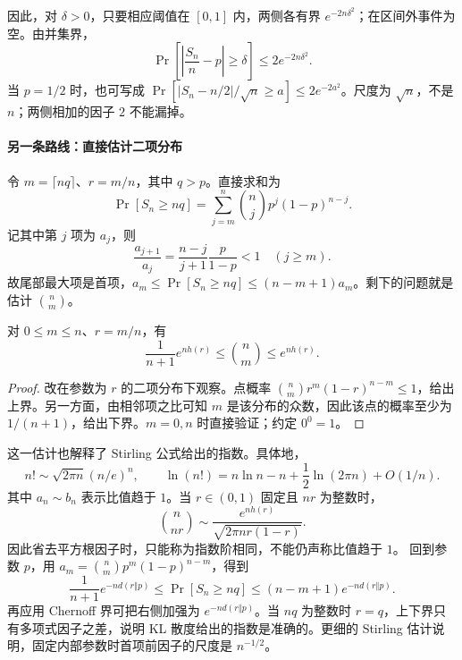 \documentclass[lang=cn,a4paper,fontset=none,zihao=false,10pt,openany,twoside]{beautybook}
\numberwithin{algorithm}{chapter}
\newcommand{\KLsep}{\mathrel{\Vert}}
\begin{document}
因此，对 $\delta>0$，只要相应阈值在 $[0,1]$ 内，两侧各有界 $e^{-2n\delta^2}$；在区间外事件为空。由并集界，
\[
 \Pr\left[\left|\frac{S_n}{n}-p\right|\ge\delta\right]\le2e^{-2n\delta^2}.
\]
当 $p=1/2$ 时，也可写成
$\Pr[|S_n-n/2|/\sqrt n\ge a]\le2e^{-2a^2}$。尺度为 $\sqrt n$，不是 $n$；两侧相加的因子 $2$ 不能漏掉。

\paragraph{另一条路线：直接估计二项分布}
令 $m=\lceil nq\rceil$、$r=m/n$，其中 $q>p$。直接求和为
\[
 \Pr[S_n\ge nq]=\sum_{j=m}^n\binom njp^j(1-p)^{n-j}.
\]
记其中第 $j$ 项为 $a_j$，则
\[
 \frac{a_{j+1}}{a_j}=\frac{n-j}{j+1}\frac p{1-p}<1\quad(j\ge m).
\]
故尾部最大项是首项，$a_m\le\Pr[S_n\ge nq]\le(n-m+1)a_m$。剩下的问题就是估计 $\binom nm$。
\begin{proposition}[二项系数的熵界]\label{prop:binomial-entropy}
对 $0\le m\le n$、$r=m/n$，有
\[
 \frac1{n+1}e^{nh(r)}\le\binom nm\le e^{nh(r)}.
\]
\end{proposition}
\begin{proof}
改在参数为 $r$ 的二项分布下观察。点概率 $\binom nm r^m(1-r)^{n-m}\le1$，给出上界。另一方面，由相邻项之比可知 $m$ 是该分布的众数，因此该点的概率至少为 $1/(n+1)$，给出下界。$m=0,n$ 时直接验证；约定 $0^0=1$。
\end{proof}
这一估计也解释了 Stirling 公式给出的指数。具体地，
\[
 n!\sim\sqrt{2\pi n}(n/e)^n,\qquad
 \ln(n!)=n\ln n-n+\frac12\ln(2\pi n)+O(1/n).
\]
其中 $a_n\sim b_n$ 表示比值趋于 $1$。当 $r\in(0,1)$ 固定且 $nr$ 为整数时，
\[
 \binom n{nr}\sim\frac{e^{nh(r)}}{\sqrt{2\pi nr(1-r)}}.
\]
因此省去平方根因子时，只能称为指数阶相同，不能仍声称比值趋于 $1$。
回到参数 $p$，用 $a_m=\binom nm p^m(1-p)^{n-m}$，得到
\[
 \frac1{n+1}e^{-nd(r\KLsep p)}
 \le\Pr[S_n\ge nq]\le(n-m+1)e^{-nd(r\KLsep p)}.
\]
再应用 Chernoff 界可把右侧加强为 $e^{-nd(r\KLsep p)}$。当 $nq$ 为整数时 $r=q$，上下界只有多项式因子之差，说明 KL 散度给出的指数是准确的。更细的 Stirling 估计说明，固定内部参数时首项前因子的尺度是 $n^{-1/2}$。
\end{document}
